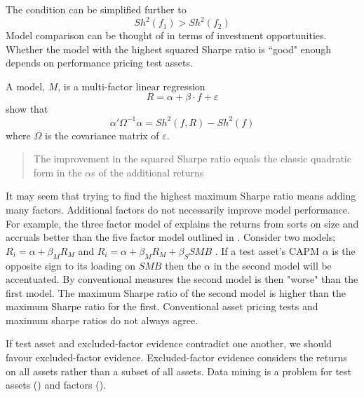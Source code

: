 The condition can be simplified further to
\[
Sh^2(f_1)>Sh^2(f_2)
\]
Model comparison can be thought of in terms of investment opportunities.
Whether the model with the highest squared Sharpe ratio is ``good" enough 
depends on performance pricing test assets.

A model, $M$, is a multi-factor linear regression
\[
R = \alpha + \beta\cdot f + \varepsilon
\]
\textcite{gibbons1989test} show that
\[
\alpha ' \Omega^{-1}\alpha = Sh^2(f, R) - Sh^2(f)
\]
where $\Omega$ is the covariance matrix of $\varepsilon$.

\begin{quotation}
  The improvement in the squared Sharpe ratio equals the classic quadratic 
  form in the $\alpha$s of the additional returns
\end{quotation}

It may seem that trying to find the highest maximum Sharpe ratio means adding 
many factors.
Additional factors do not necessarily improve model performance.
For example, the three factor model of \textcite{fama1993common} explains the 
returns from sorts on size and accruals better than the five factor model 
outlined in \textcite{fama2015five}.
Consider two models; $R_i=\alpha+\beta_MR_M$ and 
$R_i=\alpha+\beta_MR_M+\beta_SSMB$ .
If a test asset's CAPM $\alpha$ is the opposite sign to its loading on $SMB$ 
then the $\alpha$ in the second model will be accentuated.
By conventional measures the second model is then "worse" than the first model.
The maximum Sharpe ratio of the second model is higher than the maximum Sharpe 
ratio for the first.
Conventional asset pricing tests and maximum sharpe ratios do not always agree.

If test asset and excluded-factor evidence contradict one another, we should 
favour excluded-factor evidence.
Excluded-factor evidence considers the returns on all assets rather than a 
subset of all assets.
Data mining is a problem for test assets (\textcite{lewellen2010skeptical}) 
and 
factors (\textcite{harvey2016and}).

